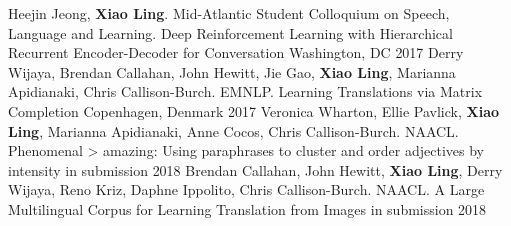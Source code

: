 
\begin{cventries}
  \cventrypublication
    {Heejin Jeong, \textbf{Xiao Ling}.  Mid-Atlantic Student Colloquium on Speech, Language and Learning.}
    {Deep Reinforcement Learning with Hierarchical Recurrent Encoder-Decoder for Conversation}
    {Washington, DC}
    {2017}
    {}
  \cventrypublication
    {Derry Wijaya, Brendan Callahan, John Hewitt, Jie Gao, \textbf{Xiao Ling}, Marianna Apidianaki, Chris Callison-Burch. EMNLP.}
    {Learning Translations via Matrix Completion}
    {Copenhagen, Denmark}
    {2017}
    {}
  \cventrypublication
    {Veronica Wharton, Ellie Pavlick, \textbf{Xiao Ling}, Marianna Apidianaki, Anne Cocos, Chris Callison-Burch. NAACL.}
    {Phenomenal > amazing: Using paraphrases to cluster and order adjectives by intensity}
    {in submission}
    {2018}
    {}
  \cventrypublication
    {Brendan Callahan, John Hewitt, \textbf{Xiao Ling}, Derry Wijaya, Reno Kriz, Daphne Ippolito,  Chris Callison-Burch. NAACL.}
    {A Large Multilingual Corpus for Learning Translation from Images}
    {in submission}
    {2018}
    {}
\end{cventries}


